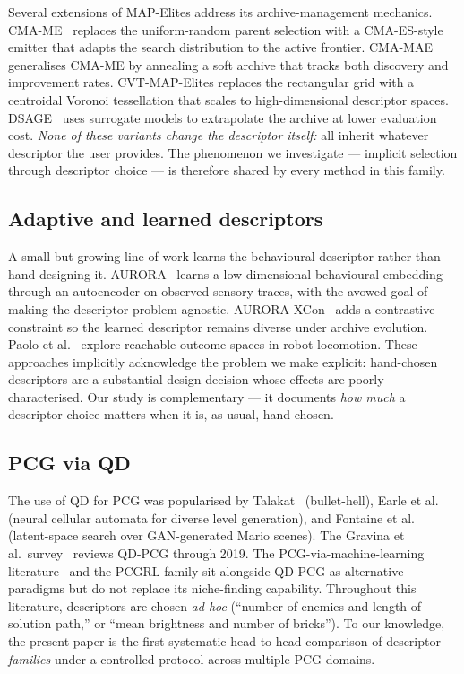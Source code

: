 \documentclass[conference]{IEEEtran}
\begin{document}
Several extensions of MAP-Elites address its archive-management
mechanics. CMA-ME~\cite{fontaine2020cma} replaces the uniform-random
parent selection with a CMA-ES-style emitter that adapts the search
distribution to the active frontier. CMA-MAE~\cite{fontaine2023cma}
generalises CMA-ME by annealing a soft archive that tracks both
discovery and improvement rates. CVT-MAP-Elites
\cite{vassiliades2017cvtmap} replaces the rectangular grid with a
centroidal Voronoi tessellation that scales to high-dimensional
descriptor spaces. DSAGE~\cite{bhatt2022dsage} uses surrogate
models to extrapolate the archive at lower evaluation cost.
\emph{None of these variants change the descriptor itself:} all
inherit whatever descriptor the user provides. The phenomenon we
investigate --- implicit selection through descriptor choice --- is
therefore shared by every method in this family.

\subsection{Adaptive and learned descriptors}

A small but growing line of work learns the behavioural descriptor
rather than hand-designing it. AURORA~\cite{cully2019autonomous}
learns a low-dimensional behavioural embedding through an
autoencoder on observed sensory traces, with the avowed goal of
making the descriptor problem-agnostic.
AURORA-XCon~\cite{grillotti2022unsupervised} adds a contrastive
constraint so the learned descriptor remains diverse under archive
evolution. Paolo et al.~\cite{paolo2020unsupervised} explore
reachable outcome spaces in robot locomotion. These approaches
implicitly acknowledge the problem we make explicit: hand-chosen
descriptors are a substantial design decision whose effects are
poorly characterised. Our study is complementary --- it documents
\emph{how much} a descriptor choice matters when it is, as usual,
hand-chosen.

\subsection{PCG via QD}

The use of QD for PCG was popularised by
Talakat~\cite{khalifa2018talakat} (bullet-hell), Earle et al.\
\cite{earle2022illuminating} (neural cellular automata for diverse
level generation), and Fontaine et al.~\cite{fontaine2021illuminating}
(latent-space search over GAN-generated Mario scenes). The
Gravina et al.\ survey~\cite{gravina2019pcgsurvey} reviews QD-PCG
through 2019. The PCG-via-machine-learning
literature~\cite{summerville2018procedural} and the PCGRL family
\cite{khalifa2020pcgrl} sit alongside QD-PCG as alternative
paradigms but do not replace its niche-finding capability.
Throughout this literature, descriptors are chosen \emph{ad hoc}
(``number of enemies and length of solution path,'' or ``mean
brightness and number of bricks''). To our knowledge, the present
paper is the first systematic head-to-head comparison of descriptor
\emph{families} under a controlled protocol across multiple PCG
domains.
\end{document}
